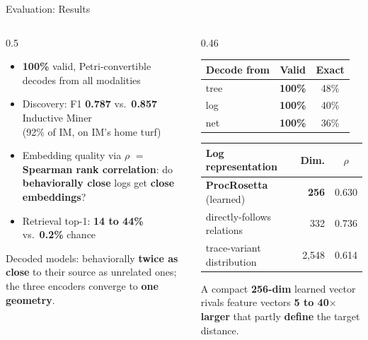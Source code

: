 \documentclass[aspectratio=169]{beamer}
\newcommand{\keyc}[1]{\textbf{\textcolor{procblue}{#1}}}
\newcommand{\keyg}[1]{\textbf{\textcolor{procgreen!70!black}{#1}}}
\newcommand{\keya}[1]{\textbf{\textcolor{procamber!85!black}{#1}}}
\begin{document}
\begin{frame}{Evaluation: Results}
  \begin{columns}[T]
  \begin{column}{0.5\textwidth}
    \begin{itemize}\setlength{\itemsep}{6pt}
      \item \keyg{100\%} valid, Petri-convertible decodes from all modalities
      \item Discovery: F1 \keyc{0.787} vs.\ \keya{0.857} Inductive Miner\\
        {\small (92\% of IM, on IM's home turf)}
      \item Embedding quality via $\rho$ $=$ \keyc{Spearman rank correlation}:
        do \keyg{behaviorally close} logs get \keyg{close embeddings}?
      \item Retrieval top-1: \keyc{14 to 44\%} vs.\ \keya{0.2\%} chance
    \end{itemize}
    \vspace{2mm}
    \small Decoded models: behaviorally \keyg{twice as close} to their source
    as unrelated ones; the three encoders converge to \keyc{one geometry}.
  \end{column}
  \begin{column}{0.46\textwidth}
    \begin{center}
    \small
    \begin{tabular}{lcc}
      \toprule
      Decode from & Valid & Exact \\
      \midrule
      tree  & \keyg{100\%} & 48\% \\
      log   & \keyg{100\%} & 40\% \\
      net   & \keyg{100\%} & 36\% \\
      \bottomrule
    \end{tabular}
    \vspace{3mm}

    \small
    \begin{tabular}{lrc}
      \toprule
      Log representation & Dim. & $\rho$ \\
      \midrule
      \keyc{ProcRosetta} (learned) & \keyc{256} & 0.630 \\
      directly-follows relations & 332 & 0.736 \\
      trace-variant distribution & 2{,}548 & 0.614 \\
      \bottomrule
    \end{tabular}
    \end{center}
    \vspace{1mm}
    \small A compact \keyc{256-dim} learned vector rivals feature vectors
    \keya{5 to 40$\times$ larger} that partly \keya{define} the target distance.
  \end{column}
  \end{columns}
\end{frame}
\end{document}
